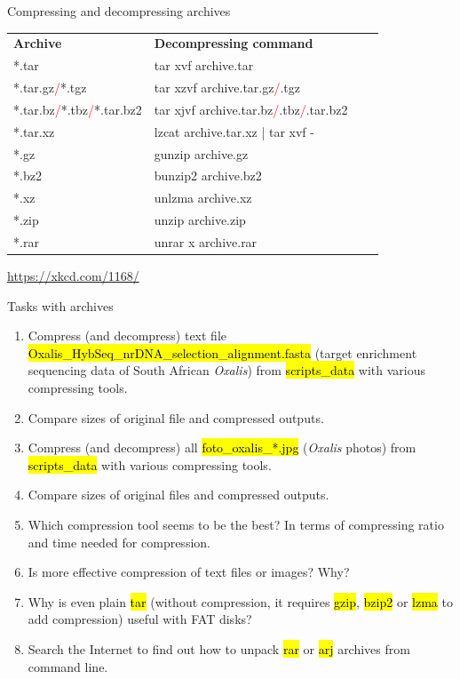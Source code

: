 \documentclass[compress, ucs, xelatex, 11pt, xcolor=svgnames, aspectratio=169,
	hyperref={
		bookmarks=true,
		unicode=true,
		colorlinks=true,
		pdftitle={Linux, command line and MetaCentrum},
		plainpages=false,
		pdfauthor={Vojtech Zeisek},
		pdfsubject={Course about use of Linux command line, writing shell scripts and using MetaCentrum of CESNET},
		pdfcreator={XeLaTeX},
		pdfkeywords={Linux, GNU, BASH, shell, command line, MetaCentrum},
		linkcolor=DarkRed, %
		anchorcolor=DarkBlue, %
		citecolor=Indigo, %
		filecolor=NavyBlue, %
		menucolor=DarkMagenta, %
		urlcolor=DarkBlue, %
		pdftex},
	url={hyphens, lowtilde} %
	]{beamer}
\renewcommand{\texttt}[1]{\hl{\ttfamily #1}}
\renewcommand{\alert}[1]{\textcolor{red}{#1}}
\begin{document}
\begin{frame}{Compressing and decompressing archives}
	\begin{center}
		\begin{tabular}{llll}
			\textbf{Archive} & \textbf{Decompressing command}\\
			*.tar & tar xvf archive.tar\\
			*.tar.gz\alert{/}*.tgz & tar xzvf archive.tar.gz\alert{/}.tgz\\
			*.tar.bz\alert{/}*.tbz\alert{/}*.tar.bz2 & tar xjvf archive.tar.bz\alert{/}.tbz\alert{/}.tar.bz2\\
			*.tar.xz & lzcat archive.tar.xz | tar xvf -\\
			*.gz & gunzip archive.gz\\
			*.bz2 & bunzip2 archive.bz2\\
			*.xz & unlzma archive.xz\\
			*.zip & unzip archive.zip\\
			*.rar & unrar x archive.rar
		\end{tabular}
		\texttt{[image: tar.png]}
		\hfill
		\url{https://xkcd.com/1168/}
	\end{center}
\end{frame}

\begin{frame}{Tasks with archives}
	\begin{enumerate}
		\item Compress (and decompress) text file \texttt{Oxalis\_HybSeq\_nrDNA\_selection\_alignment.fasta} (target enrichment sequencing data of South African \textit{Oxalis}) from \texttt{scripts\_data} with various compressing tools.
		\item Compare sizes of original file and compressed outputs.
		\item Compress (and decompress) all \texttt{foto\_oxalis\_*.jpg} (\textit{Oxalis} photos) from \texttt{scripts\_data} with various compressing tools.
		\item Compare sizes of original files and compressed outputs.
		\item Which compression tool seems to be the best? In terms of compressing ratio and time needed for compression.
		\item Is more effective compression of text files or images? Why?
		\item Why is even plain \texttt{tar} (without compression, it requires \texttt{gzip}, \texttt{bzip2} or \texttt{lzma} to add compression) useful with FAT disks?
		\item Search the Internet to find out how to unpack \texttt{rar} or \texttt{arj} archives from command line.
	\end{enumerate}
\end{frame}
\end{document}
